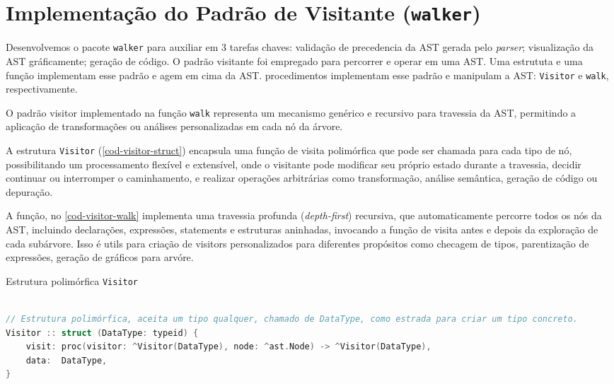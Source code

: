 
\section{Implementação do Padrão de Visitante (\texttt{walker})}

Desenvolvemos o pacote \texttt{walker} para auxiliar em 3 tarefas chaves: validação de precedencia da AST gerada pelo \textit{parser}; visualização da AST gráficamente; geração de código. O padrão visitante foi empregado para percorrer e operar em uma AST. Uma estrututa e uma função implementam esse padrão e agem em cima da AST. procedimentos implementam esse padrão e manipulam a AST: \texttt{Visitor} e \texttt{walk}, respectivamente.


O padrão visitor implementado na função \texttt{walk} representa um mecanismo genérico e recursivo para travessia da AST, permitindo a aplicação de transformações ou análises personalizadas em cada nó da árvore.

A estrutura \texttt{Visitor} (\autoref{cod-visitor-struct}) encapsula uma função de visita polimórfica que pode ser chamada para cada tipo de nó, possibilitando um processamento flexível e extensível, onde o visitante pode modificar seu próprio estado durante a travessia, decidir continuar ou interromper o caminhamento, e realizar operações arbitrárias como transformação, análise semântica, geração de código ou depuração.

A função, no \autoref{cod-visitor-walk} implementa uma travessia profunda (\textit{depth-first}) recursiva, que automaticamente percorre todos os nós da AST, incluindo declarações, expressões, statements e estruturas aninhadas, invocando a função de visita antes e depois da exploração de cada subárvore. Isso é utils para criação de visitors personalizados para diferentes propósitos como checagem de tipos, parentização de expressões, geração de gráficos para arvóre.


\begin{codigo}[htb]
    \caption{\small Estrutura polimórfica \texttt{Visitor}}
        \label{cod-visitor-struct}
\begin{lstlisting}[language = C]

// Estrutura polimórfica, aceita um tipo qualquer, chamado de DataType, como estrada para criar um tipo concreto.
Visitor :: struct (DataType: typeid) {
    visit: proc(visitor: ^Visitor(DataType), node: ^ast.Node) -> ^Visitor(DataType),
    data:  DataType,
}
\end{lstlisting}
\end{codigo}

